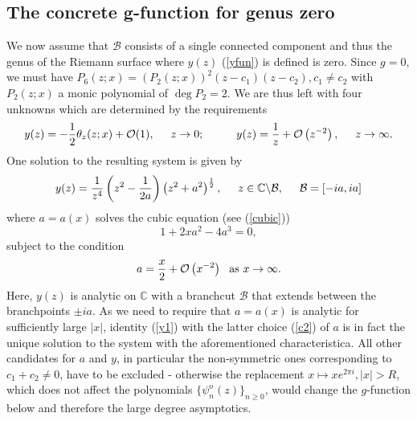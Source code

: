 \documentclass[10pt,oneside,reqno]{amsart}
\numberwithin{equation}{section}
\def\eqref#1{(\ref{#1})}
\begin{document}
\subsection{The concrete g-function for genus zero}\label{ggen0} 
We now assume that $\mathcal B$ consists of a single connected component and thus the genus of the Riemann surface where $y(z)$ \eqref{yfun} is defined is zero.
 Since $g=0$, we must have $P_6(z;x) = \left(P_2(z;x)\right)^2(z-c_1)(z-c_2),c_1\neq c_2$ with 
$P_2(z;x)$ a monic polynomial of $\deg P_2 =2$. We are thus left with four unknowns which are determined by the requirements
\begin{equation}\label{cond}
  y(z) = -\frac{1}{2}\theta_{z}(z;x)+\mathcal O(1),\hspace{0.5cm}z\rightarrow 0;\hspace{1cm}y(z) = \frac{1}{z}+\mathcal O\left(z^{-2}\right),
  \hspace{0.5cm}z\rightarrow\infty.
\end{equation}
One solution to the resulting system is given by
\begin{equation}\label{y1}
  y(z) = \frac{1}{z^4}\left(z^2-\frac{1}{2a}\right)\left(z^2+a^2\right)^{\frac{1}{2}},\hspace{0.5cm}z\in\mathbb{C}\backslash\mathcal{B},
\hspace{0.5cm}\mathcal{B}=[-ia,ia]
\end{equation}
where $a=a(x)$ solves the cubic equation (see \eqref{cubic})
\begin{equation}\label{c1}
  1+2xa^2-4a^3=0,
\end{equation}
subject to the condition 
\begin{equation}\label{c2}
 a= \frac{x}{2}+\mathcal{O}\left(x^{-2}\right)\ \ \textnormal{as}\  x\rightarrow\infty.
\end{equation}
Here, $y(z)$ is analytic on $\mathbb{C}$ with a branchcut $\mathcal{B}$ that extends between
the branchpoints $\pm ia$.  As we need to require that $a=a(x)$ is analytic for sufficiently large $|x|$, identity \eqref{y1} with the latter choice \eqref{c2} of $a$ is in fact the
unique solution to the system with the aforementioned characteristica. All other candidates for $a$ and $y$, in particular the non-symmetric ones corresponding to $c_1+c_2\neq 0$, 
have to be excluded - otherwise the replacement $x\mapsto x e^{2\pi i},|x|>R$, which does not affect the polynomials $\{\psi_n^o(z)\}_{n\geq 0}$, would change the $g$-function below and therefore the large degree asymptotics.\smallskip
\end{document}
